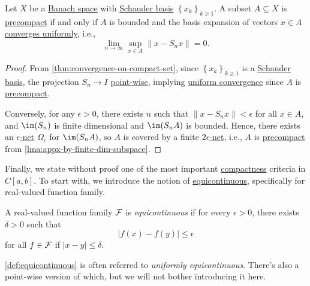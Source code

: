 \begin{corollary}
	Let \(X\) be a \hyperref[def:Banach-space]{Banach space} with \hyperref[def:Schauder-basis]{Schauder basis} \(\left\{ x_k \right\}_{k \geq 1} \). A subset \(A \subseteq X\) is \hyperref[def:precompact]{precompact} if and only if \(A\) is bounded and the basis expansion of vectors \(x\in A\) \hyperref[def:uniformly-convergence]{converges uniformly}, i.e.,
	\[
		\lim_{n \to \infty} \sup _{x\in A} \left\lVert x - S_n x\right\rVert = 0.
	\]
\end{corollary}
\begin{proof}
	From \autoref{thm:convergence-on-compact-set}, since \(\left\{ x_k \right\} _{k\geq 1}\) is a \hyperref[def:Schauder-basis]{Schauder basis}, the projection \(S_n \to I\) \hyperref[def:point-wise-convergence]{point-wise}, implying \hyperref[def:uniformly-convergence]{uniform convergence} since \(A\) is \hyperref[def:precompact]{precompact}.

	Conversely, for any \(\epsilon > 0\), there exists \(n\) such that \(\left\lVert x - S_n x\right\rVert < \epsilon \) for all \(x\in A\), and \(\im (S_n)\)  is finite dimensional and \(\im(S_n A)\) is bounded. Hence, there exists an \hyperref[def:eps-net]{\(\epsilon \)-net} \(\Omega _\epsilon \) for \(\im(S_n A)\), so \(A\) is covered by a finite \hyperref[def:eps-net]{\(2\epsilon \)-net}, i.e., \(A\) is \hyperref[def:precompact]{precompact} from \autoref{lma:appx-by-finite-dim-subspace}.
\end{proof}

Finally, we state without proof one of the most important \hyperref[def:compact]{compactness} criteria in \(C[a, b]\). To start with, we introduce the notion of \hyperref[def:equicontinuous]{equicontinuous}, specifically for real-valued function family.

\begin{definition}[Equicontinuous]\label{def:equicontinuous}
	A real-valued function family \(\mathcal{\MakeUppercase{f}} \) is \emph{equicontinuous} if for every \(\epsilon > 0\), there exists \(\delta > 0\) such that
	\[
		\vert f(x) - f(y) \vert \leq \epsilon
	\]
	for all \(f\in \mathcal{\MakeUppercase{f}} \) if \(\vert x - y \vert \leq \delta \).
\end{definition}

\begin{remark}
	\autoref{def:equicontinuous} is often referred to \emph{uniformly equicontinuous}. There's also a point-wise version of which, but we will not bother introducing it here.
\end{remark}

